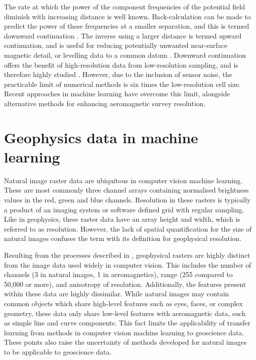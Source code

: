 \documentclass[manuscript.tex]{subfiles}
\begin{document}
The rate at which the power of the component frequencies of the potential field diminish with increasing distance is well known.
Back-calculation can be made to predict the power of these frequencies at a smaller separation, and this is termed downward continuation \textcite{bullardDeterminationMassesNecessary1948,blakelyPotentialTheoryGravity1996}.
The inverse using a larger distance is termed upward continuation, and is useful for reducing potentially unwanted near-surface magnetic detail, or levelling data to a common datum \parencite[e.g.\ open file magnetic data in Australia is available levelled to the AWAGS datum][]{mintyAirborneGeophysicalMapping2011}.
Downward continuation offers the benefit of high-resolution data from low-resolution sampling, and is therefore highly studied \parencite{zuoDownwardContinuationTransformation2020,fediStableDownwardContinuation2002,zhangNumericalSolutionsMeanValue2018,guoPotentialFieldContinuation2020,gangImprovedStableDownward2018,pilkingtonPotentialFieldContinuation2017}.
However, due to the inclusion of sensor noise, the practicable limit of numerical methods is six times the low-resolution cell size.
Recent approaches in machine learning have overcome this limit, alongside alternative methods for enhancing aeromagnetic survey resolution.

\section{Geophysics data in machine learning}
\label{sec:introdata}
Natural image raster data are ubiquitous in computer vision machine learning.
These are most commonly three channel arrays containing normalised brightness values in the red, green and blue channels.
Resolution in these rasters is typically a product of an imaging system or software defined grid with regular sampling.
Like in geophysics, these raster data have an array height and width, which is referred to as resolution.
However, the lack of spatial quantification for the size of natural images confuses the term with its definition for geophysical resolution.

Resulting from the processes described in , geophysical rasters are highly distinct from the image data used widely in computer vision.
This includes the number of channels (3 in natural images, 1 in aeromagnetics), range (255 compared to 50,000 or more), and anisotropy of resolution.
Additionally, the features present within these data are highly dissimilar.
While natural images may contain common objects which share high-level features such as eyes, faces, or complex geometry, these data only share low-level features with aeromagnetic data, such as simple line and curve components.
This fact limits the applicability of transfer learning from methods in computer vision machine learning \parencite{tanSurveyDeepTransfer2018} to geoscience data.
These points also raise the uncertainty of methods developed for natural images to be  applicable to geoscience data.
\end{document}
